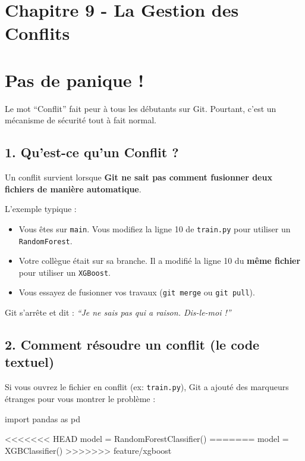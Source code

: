 \documentclass[
  letterpaper,
  DIV=11,
  numbers=noendperiod]{scrreprt}
\newenvironment{Shaded}{\begin{snugshade}}{\end{snugshade}}
\newcommand{\ImportTok}[1]{\textcolor[rgb]{0.00,0.46,0.62}{#1}}
\newcommand{\NormalTok}[1]{\textcolor[rgb]{0.00,0.23,0.31}{#1}}
\newcommand{\OperatorTok}[1]{\textcolor[rgb]{0.37,0.37,0.37}{#1}}
\begin{document}

\section{Chapitre 9 - La Gestion des
Conflits}\label{chapitre-9---la-gestion-des-conflits}


\section{Pas de panique !}\label{pas-de-panique}

Le mot ``Conflit'' fait peur à tous les débutants sur Git. Pourtant,
c'est un mécanisme de sécurité tout à fait normal.

\subsection{1. Qu'est-ce qu'un Conflit ?}\label{quest-ce-quun-conflit}

Un conflit survient lorsque \textbf{Git ne sait pas comment fusionner
deux fichiers de manière automatique}.

L'exemple typique :

\begin{itemize}
\item
  Vous êtes sur \texttt{main}. Vous modifiez la ligne 10 de
  \texttt{train.py} pour utiliser un \texttt{RandomForest}.
\item
  Votre collègue était sur sa branche. Il a modifié la ligne 10 du
  \textbf{même fichier} pour utiliser un \texttt{XGBoost}.
\item
  Vous essayez de fusionner vos travaux (\texttt{git\ merge} ou
  \texttt{git\ pull}).
\end{itemize}

Git s'arrête et dit : \emph{``Je ne sais pas qui a raison. Dis-le-moi
!''}

\subsection{2. Comment résoudre un conflit (le code
textuel)}\label{comment-ruxe9soudre-un-conflit-le-code-textuel}

Si vous ouvrez le fichier en conflit (ex: \texttt{train.py}), Git a
ajouté des marqueurs étranges pour vous montrer le problème :

\begin{Shaded}
\begin{Highlighting}[]
\ImportTok{import}\NormalTok{ pandas }\ImportTok{as}\NormalTok{ pd}

\OperatorTok{\textless{}\textless{}\textless{}\textless{}\textless{}\textless{}\textless{}}\NormalTok{ HEAD}
\NormalTok{model }\OperatorTok{=}\NormalTok{ RandomForestClassifier()}
\OperatorTok{=======}
\NormalTok{model }\OperatorTok{=}\NormalTok{ XGBClassifier()}
\OperatorTok{\textgreater{}\textgreater{}\textgreater{}\textgreater{}\textgreater{}\textgreater{}\textgreater{}}\NormalTok{ feature}\OperatorTok{/}\NormalTok{xgboost}
\end{Highlighting}
\end{Shaded}
\end{document}
